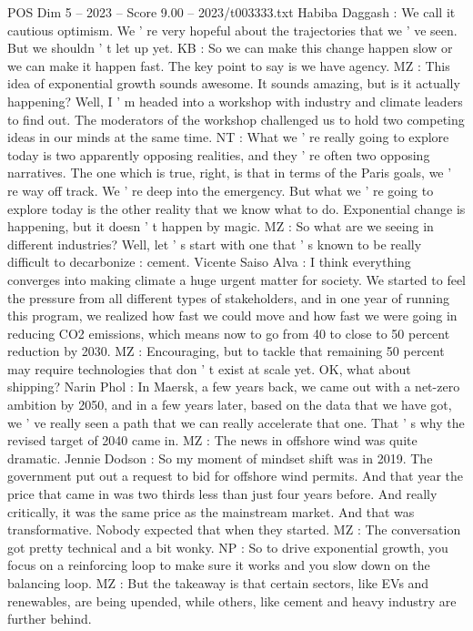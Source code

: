 \begin{textsample}{POS Dim 5 – 2023 – Score 9.00 – 2023/t003333.txt}
Habiba Daggash : We call it cautious optimism.
We ' re very hopeful about the trajectories that we ' ve seen.
But we shouldn ' t let up yet.
KB : So we can make this change happen slow or we can make it happen fast.
The key point to say is we have agency.
MZ : This idea of exponential growth sounds awesome.
It sounds amazing, but is it actually happening?
Well, I ' m headed into a workshop with industry and climate leaders to find out.
The moderators of the workshop challenged us to hold two competing ideas in our minds at the same time.
NT : What we ' re really going to explore today is two apparently opposing realities, and they ' re often two opposing narratives.
The one which is true, right, is that in terms of the Paris goals, we ' re way off track.
We ' re deep into the emergency.
But what we ' re going to explore today is the other reality that we know what to do.
Exponential change is happening, but it doesn ' t happen by magic.
MZ : So what are we seeing in different industries?
Well, let ' s start with one that ' s known to be really difficult to decarbonize : cement.
Vicente Saiso Alva : I think everything converges into making climate a huge urgent matter for society.
We started to feel the pressure from all different types of stakeholders, and in one year of running this program, we realized how fast we could move and how fast we were going in reducing CO2 emissions, which means now to go from 40 to close to 50 percent reduction by 2030.
MZ : Encouraging, but to tackle that remaining 50 percent may require technologies that don ' t exist at scale yet.
OK, what about shipping?
Narin Phol : In Maersk, a few years back, we came out with a net-zero ambition by 2050, and in a few years later, based on the data that we have got, we ' ve really seen a path that we can really accelerate that one.
That ' s why the revised target of 2040 came in.
MZ : The news in offshore wind was quite dramatic.
Jennie Dodson : So my moment of mindset shift was in 2019.
The government put out a request to bid for offshore wind permits.
And that year the price that came in was two thirds less than just four years before.
And really critically, it was the same price as the mainstream market.
And that was transformative.
Nobody expected that when they started.
MZ : The conversation got pretty technical and a bit wonky.
NP : So to drive exponential growth, you focus on a reinforcing loop to make sure it works and you slow down on the balancing loop.
MZ : But the takeaway is that certain sectors, like EVs and renewables, are being upended, while others, like cement and heavy industry are further behind.

\end{textsample}
